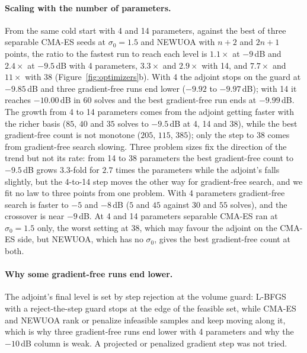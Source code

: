 \documentclass{anvil-paper}
\begin{document}
\paragraph{Scaling with the number of parameters.}
From the same cold start with 4 and 14 parameters, against the best of three
separable CMA-ES seeds at $\sigma_0 = 1.5$ and NEWUOA with $n + 2$ and
$2n + 1$ points, the ratio to the fastest run to reach each level is
$1.1\times$ at $-9$\,dB and $2.4\times$ at $-9.5$\,dB with 4 parameters,
$3.3\times$ and $2.9\times$ with 14, and $7.7\times$ and $11\times$ with 38 (Figure~\ref{fig:optimizers}b). With 4 the adjoint stops on the guard
at $-9.85$\,dB and three gradient-free runs end lower ($-9.92$ to
$-9.97$\,dB); with 14 it reaches $-10.00$\,dB in $60$ solves and the best
gradient-free run ends at $-9.99$\,dB. The growth from 4 to 14 parameters
comes from the adjoint getting faster with the richer basis ($85$, $40$ and
$35$ solves to $-9.5$\,dB at 4, 14 and 38), while the best gradient-free
count is not monotone ($205$, $115$, $385$); only the step to 38 comes from
gradient-free search slowing. Three problem sizes fix the direction of the
trend but not its rate: from 14 to 38 parameters the best gradient-free count
to $-9.5$\,dB grows $3.3$-fold for $2.7$ times the parameters while the
adjoint's falls slightly, but the 4-to-14 step moves the other way for
gradient-free search, and we fit no law to three points from one problem. With 4 parameters gradient-free search is
faster to $-5$ and $-8$\,dB ($5$ and $45$ against $30$ and $55$ solves), and
the crossover is near $-9$\,dB. At 4 and 14 parameters separable CMA-ES ran
at $\sigma_0 = 1.5$ only, the worst setting at 38, which may favour the
adjoint on the CMA-ES side, but NEWUOA, which has no $\sigma_0$, gives the
best gradient-free count at both.

\paragraph{Why some gradient-free runs end lower.}
The adjoint's final level is set by step
rejection at the volume guard: L-BFGS with a reject-the-step guard stops at
the edge of the feasible set, while CMA-ES and NEWUOA rank or penalize
infeasible samples and keep moving along it, which is why three
gradient-free runs end lower with 4 parameters and why the $-10$\,dB column
is weak. A projected or penalized gradient step was not tried.
\end{document}
